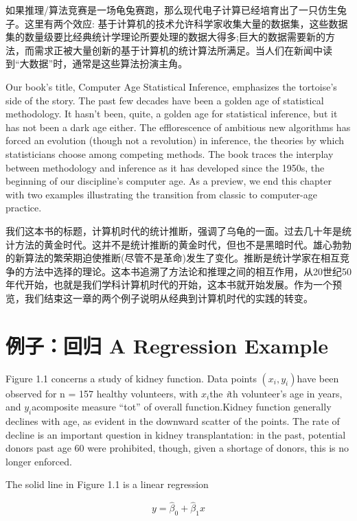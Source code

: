 \documentclass[]{ctexbook}
\theoremstyle{definition}
\theoremstyle{definition}
\theoremstyle{definition}
\theoremstyle{remark}
\begin{document}
如果推理/算法竞赛是一场龟兔赛跑，那么现代电子计算已经培育出了一只仿生兔子。这里有两个效应:
基于计算机的技术允许科学家收集大量的数据集，这些数据集的数量级要比经典统计学理论所要处理的数据大得多;巨大的数据需要新的方法，而需求正被大量创新的基于计算机的统计算法所满足。当人们在新闻中读到``大数据''时，通常是这些算法扮演主角。

Our book's title, Computer Age Statistical Inference, emphasizes the
tortoise's side of the story. The past few decades have been a golden
age of statistical methodology. It hasn't been, quite, a golden age for
statistical inference, but it has not been a dark age either. The
efflorescence of ambitious new algorithms has forced an evolution
(though not a revolution) in inference, the theories by which
statisticians choose among competing methods. The book traces the
interplay between methodology and inference as it has developed since
the 1950s, the beginning of our discipline's computer age. As a preview,
we end this chapter with two examples illustrating the transition from
classic to computer-age practice.

我们这本书的标题，计算机时代的统计推断，强调了乌龟的一面。过去几十年是统计方法的黄金时代。这并不是统计推断的黄金时代，但也不是黑暗时代。雄心勃勃的新算法的繁荣期迫使推断(尽管不是革命)发生了变化。推断是统计学家在相互竞争的方法中选择的理论。这本书追溯了方法论和推理之间的相互作用，从20世纪50年代开始，也就是我们学科计算机时代的开始，这本书就开始发展。作为一个预览，我们结束这一章的两个例子说明从经典到计算机时代的实践的转变。

\hypertarget{-a-regression-example}{%
\section{例子：回归 A Regression Example}\label{-a-regression-example}}

Figure 1.1 concerns a study of kidney function. Data points
\((x_i , y_i)\)have been observed for n = 157 healthy volunteers, with
\(x_i\)the \emph{i}th volunteer's age in years, and \(y_i\)acomposite
measure ``tot'' of overall function.Kidney function generally declines
with age, as evident in the downward scatter of the points. The rate of
decline is an important question in kidney transplantation: in the past,
potential donors past age 60 were prohibited, though, given a shortage
of donors, this is no longer enforced.

The solid line in Figure 1.1 is a linear regression

\[
y = \hat { \beta } _ { 0 } + \hat { \beta } _ { 1 } x
\]
\end{document}
